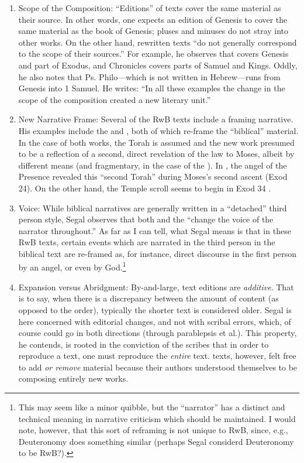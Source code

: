 \begin{enumerate}

    \item Scope of the Composition: ``Editions'' of texts cover the same material as their source. In other words, one expects an edition of Genesis to cover the same material as the book of Genesis; pluses and minuses do not stray into other works. On the other hand, rewritten texts ``do not generally correspond to the scope of their sources.''\autocite[20]{segal_henze2005} For example, he observes that \jub covers Genesis and part of Exodus, and Chronicles covers parts of Samuel and Kings. Oddly, he also notes that Ps. Philo---which is not written in Hebrew---runs from Genesis into 1 Samuel. He writes: ``In all these examples the change in the scope of the composition created a new literary unit.'' \autocite[20--21]{segal_henze2005}
  
    \item New Narrative Frame: Several of the RwB texts include a framing narrative. His examples include the \templescroll and \jub, both of which re-frame the ``biblical'' material. In the case of both works, the Torah is assumed and the new work presumed to be a reflection of a second, direct revelation of the law to Moses, albeit by different means (and fragmentary, in the case of the \templescroll). In \jub, the angel of the Presence revealed this ``second Torah'' during Moses's second ascent (Exod 24). On the other hand, the Temple scroll seems to begin in Exod 34 \autocite[22]{segal_henze2005}.
   
    \item Voice: While biblical narratives are generally written in a ``detached'' third person style, Segal observes that both \jub and the \templescroll ``change the voice of the narrator throughout.'' \autocite[22]{segal_henze2005} As far as I can tell, what Segal means is that in these RwB texts, certain events which are narrated in the third person in the biblical text are re-framed as, for instance, direct discourse in the first person by an angel, or even by God.\footnote{This may seem like a   minor quibble, but the ``narrator'' has a distinct and technical   meaning in narrative criticism which should be maintained. I would   note, however, that this sort of reframing is not unique to RwB,   since, e.g., Deuteronomy does something similar (perhaps Segal   considerd Deuteronomy to be RwB?).}
 
    \item Expansion versus Abridgment: By-and-large, text editions are \emph{additive}. That is to say, when there is a discrepancy between the amount of content (as opposed to the order), typically the shorter text is considered older. Segal is here concerned with editorial changes, and not with scribal errors, which, of course could go in both directions (through parablepsis et al.). This property, he contends, is rooted in the conviction of the scribes that in order to reproduce a text, one must reproduce the \emph{entire} text.\autocite[24]{segal_henze2005} \rwb texts, however, felt free to add \emph{or remove} material because their authors understood themselves to be composing entirely new works.\autocite[24]{segal_henze2005} 


\end{enumerate}
